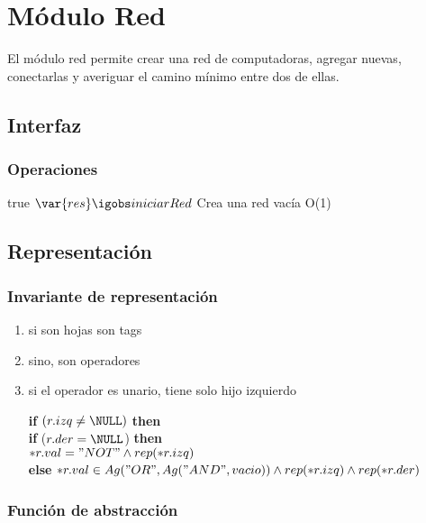 
\section{Módulo Red}

El módulo red permite crear una red de computadoras, agregar nuevas, conectarlas y averiguar el camino mínimo entre dos de ellas.

\subsection{Interfaz}


\subsubsection*{Operaciones}

 {true}
 {$\var{res} \igobs iniciarRed$}
 {Crea una red vacía}
 {O(1)}


\subsection{Representación}


\subsubsection*{Invariante de representación}

\begin{enumerate}
	\item si son hojas son tags
	\item sino, son operadores
	\item si el operador es unario, tiene solo hijo izquierdo

		 \textbf{if} $(r.izq \neq \NULL)$ \textbf{then} \\
		\textbf{if} ($r.der = \NULL$) \textbf{then} \\
		$*r.val = "NOT" \land rep(*r.izq)$ \\
		\textbf{else} $*r.val \in Ag("OR", Ag("AND",vacio)) \land rep(*r.izq) \land rep(*r.der)$
		\end{enumerate}

\subsubsection*{Función de abstracción}

